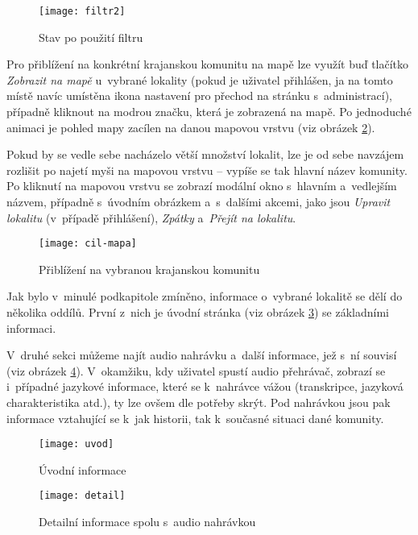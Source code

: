 \begin{figure}  
    \centering
    \texttt{[image: filtr2]}  
    \caption{Stav po použití filtru}
    \label{filtr2}
\end{figure}

Pro přiblížení na konkrétní krajanskou komunitu na mapě lze využít buď tlačítko \emph{Zobrazit na mapě} u~vybrané lokality (pokud je uživatel přihlášen, ja na tomto místě navíc umístěna ikona nastavení pro přechod na stránku s~administrací), případně kliknout na modrou značku, která je zobrazená na mapě. Po jednoduché animaci je pohled mapy zacílen na danou mapovou vrstvu (viz obrázek \ref{cil-mapa}).

Pokud by se vedle sebe nacházelo větší množství lokalit, lze je od sebe navzájem rozlišit po najetí myši na mapovou vrstvu -- vypíše se tak hlavní název komunity. Po kliknutí na mapovou vrstvu se zobrazí modální okno s~hlavním a~vedlejším názvem, případně s~úvodním obrázkem a~s~dalšími akcemi, jako jsou \emph{Upravit lokalitu} (v~případě přihlášení), \emph{Zpátky} a~\emph{Přejít na lokalitu}.

\begin{figure} 
    \centering
    \texttt{[image: cil-mapa]}  
    \caption{Přiblížení na vybranou krajanskou komunitu}
    \label{cil-mapa}
\end{figure}

Jak bylo v~minulé podkapitole zmíněno, informace o~vybrané lokalitě se dělí do několika oddílů. První z~nich je úvodní stránka (viz obrázek \ref{uvod}) se základními informaci.

V~druhé sekci můžeme najít audio nahrávku a~další informace, jež s~ní souvisí (viz obrázek \ref{detail}). V~okamžiku, kdy uživatel spustí audio přehrávač, zobrazí se i~případné jazykové informace, které se k~nahrávce vážou (transkripce, jazyková charakteristika atd.), ty lze ovšem dle potřeby skrýt. Pod nahrávkou jsou pak informace vztahující se k~jak historii, tak k~současné situaci dané komunity.

\begin{figure} 
    \centering
    \texttt{[image: uvod]}  
    \caption{Úvodní informace}
    \label{uvod}
\end{figure}

\begin{figure}
    \centering
    \texttt{[image: detail]}  
    \caption{Detailní informace spolu s~audio nahrávkou}
    \label{detail}
\end{figure}

